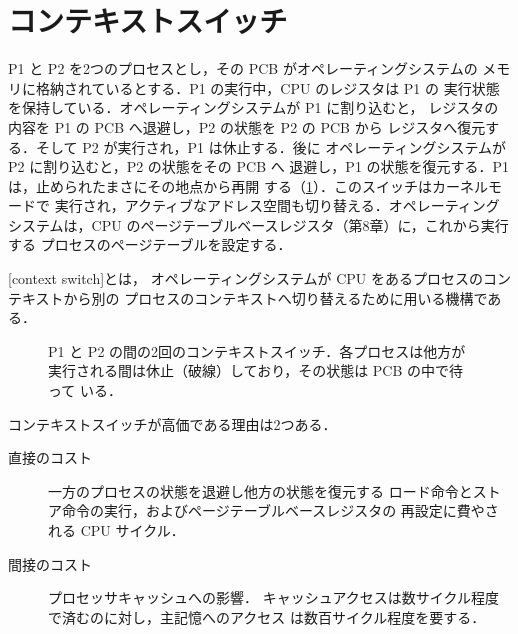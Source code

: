 \documentclass[../main.tex]{subfiles}
\begin{document}
\section{コンテキストスイッチ}
\label{sec:l02-context-switch}

P1 と P2 を2つのプロセスとし，その PCB がオペレーティングシステムの
メモリに格納されているとする．P1 の実行中，CPU のレジスタは P1 の
実行状態を保持している．オペレーティングシステムが P1 に割り込むと，
レジスタの内容を P1 の PCB へ退避し，P2 の状態を P2 の PCB から
レジスタへ復元する．そして P2 が実行され，P1 は休止する．後に
オペレーティングシステムが P2 に割り込むと，P2 の状態をその PCB へ
退避し，P1 の状態を復元する．P1 は，止められたまさにその地点から再開
する（\cref{fig:l02-context-switch}）．このスイッチはカーネルモードで
実行され，アクティブなアドレス空間も切り替える．オペレーティング
システムは，CPU のページテーブルベースレジスタ（第8章）に，これから実行する
プロセスのページテーブルを設定する．

\begin{definition}[コンテキストスイッチ]
  [context switch]とは，
  オペレーティングシステムが CPU をあるプロセスのコンテキストから別の
  プロセスのコンテキストへ切り替えるために用いる機構である．
\end{definition}

\begin{figure}[htbp]
  \centering
  
  \caption{P1 と P2 の間の2回のコンテキストスイッチ．各プロセスは他方が
    実行される間は休止（破線）しており，その状態は PCB の中で待って
    いる．}
  \label{fig:l02-context-switch}
\end{figure}

コンテキストスイッチが高価である理由は2つある．
\begin{description}
  \item[直接のコスト] 一方のプロセスの状態を退避し他方の状態を復元する
    ロード命令とストア命令の実行，およびページテーブルベースレジスタの
    再設定に費やされる CPU サイクル．
  \item[間接のコスト] プロセッサキャッシュへの影響．%
    キャッシュアクセスは数サイクル程度で済むのに対し，主記憶へのアクセス
    は数百サイクル程度を要する．
\end{description}
\end{document}
